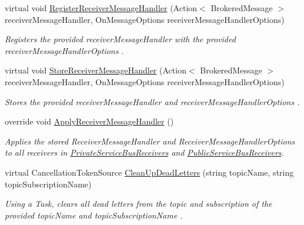 \begin{DoxyCompactItemize}
virtual void \hyperlink{classCqrs_1_1Azure_1_1ServiceBus_1_1AzureServiceBus_ad19764cc41efba37d6a8d96f8a58f906_ad19764cc41efba37d6a8d96f8a58f906}{Register\+Receiver\+Message\+Handler} (Action$<$ Brokered\+Message $>$ receiver\+Message\+Handler, On\+Message\+Options receiver\+Message\+Handler\+Options)
\begin{DoxyCompactList}\small\item\em Registers the provided {\itshape receiver\+Message\+Handler}  with the provided {\itshape receiver\+Message\+Handler\+Options} . \end{DoxyCompactList}\item 
virtual void \hyperlink{classCqrs_1_1Azure_1_1ServiceBus_1_1AzureServiceBus_adae5c09b9b3123bd998e99b5b76e21e2_adae5c09b9b3123bd998e99b5b76e21e2}{Store\+Receiver\+Message\+Handler} (Action$<$ Brokered\+Message $>$ receiver\+Message\+Handler, On\+Message\+Options receiver\+Message\+Handler\+Options)
\begin{DoxyCompactList}\small\item\em Stores the provided {\itshape receiver\+Message\+Handler}  and {\itshape receiver\+Message\+Handler\+Options} . \end{DoxyCompactList}\item 
override void \hyperlink{classCqrs_1_1Azure_1_1ServiceBus_1_1AzureServiceBus_a6ea94560e02fce0d920c467062f5fc98_a6ea94560e02fce0d920c467062f5fc98}{Apply\+Receiver\+Message\+Handler} ()
\begin{DoxyCompactList}\small\item\em Applies the stored Receiver\+Message\+Handler and Receiver\+Message\+Handler\+Options to all receivers in \hyperlink{classCqrs_1_1Azure_1_1ServiceBus_1_1AzureServiceBus_ac52e1a7e17f4ffb80f95d31424101aaa_ac52e1a7e17f4ffb80f95d31424101aaa}{Private\+Service\+Bus\+Receivers} and \hyperlink{classCqrs_1_1Azure_1_1ServiceBus_1_1AzureServiceBus_ac73f294e6a99655f2ff7e391646f2e5d_ac73f294e6a99655f2ff7e391646f2e5d}{Public\+Service\+Bus\+Receivers}. \end{DoxyCompactList}\item 
virtual Cancellation\+Token\+Source \hyperlink{classCqrs_1_1Azure_1_1ServiceBus_1_1AzureServiceBus_a8d1d5833d49b7793933825f2a13fb8b7_a8d1d5833d49b7793933825f2a13fb8b7}{Clean\+Up\+Dead\+Letters} (string topic\+Name, string topic\+Subscription\+Name)
\begin{DoxyCompactList}\small\item\em Using a Task, clears all dead letters from the topic and subscription of the provided {\itshape topic\+Name}  and {\itshape topic\+Subscription\+Name} . \end{DoxyCompactList}\item 

\end{DoxyCompactItemize}
